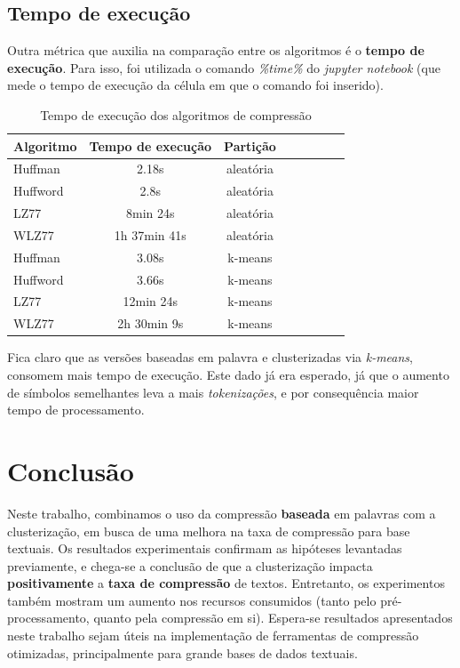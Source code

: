 \subsection{Tempo de execução}
Outra métrica que auxilia na comparação entre os algoritmos é o \textbf{tempo de execução}.
Para isso, foi utilizada o comando \emph{\%time\%} do \emph{jupyter notebook} (que mede o tempo de execução da célula em que o comando foi inserido).

\begin{table}[H]
   \centering
   \caption{Tempo de execução dos algoritmos de compressão} \label{tab:vcode}
   \begin{tabular}{|l|c|c|c|c|c|c|r|}
        \hline
        \small{Algoritmo} & \small{Tempo de execução} & \small{Partição} \\ \hline
              Huffman   &   2.18s                        & aleatória \\ \hline
              Huffword  &   2.8s                          & aleatória \\ \hline
              LZ77        &   8min 24s                  & aleatória \\ \hline
              WLZ77    &   1h 37min 41s           & aleatória \\ \hline
              Huffman  &   3.08s                       & k-means \\ \hline
              Huffword &   3.66s                       & k-means \\ \hline
              LZ77       &   12min 24s               & k-means \\ \hline
              WLZ77   &   2h 30min 9s            & k-means \\ \hline
  \end{tabular}
\end{table}

Fica claro que as versões baseadas em palavra e clusterizadas via \emph{k-means}, consomem mais tempo de execução.
Este dado já era esperado, já que o aumento de símbolos semelhantes leva a mais \emph{tokenizações}, e por consequência maior tempo de processamento.

\section{Conclusão}
Neste trabalho, combinamos o uso da compressão \textbf{baseada} em palavras com a clusterização, em busca de uma melhora na taxa de compressão para base textuais.
Os resultados experimentais confirmam as hipóteses levantadas previamente, 
e chega-se a conclusão de que a clusterização impacta \textbf{positivamente} a \textbf{taxa de compressão} de textos.
Entretanto, os experimentos também mostram um aumento nos recursos consumidos (tanto pelo pré-processamento, quanto pela compressão em si).
Espera-se resultados apresentados neste trabalho sejam úteis na implementação de ferramentas de compressão otimizadas, principalmente para grande bases de dados textuais.

